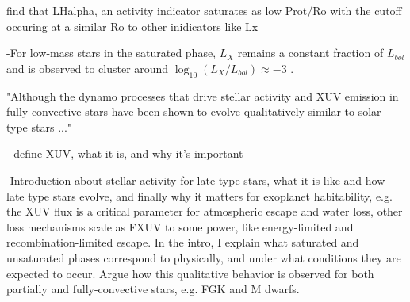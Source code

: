 \documentclass[twocolumn]{aastex62}
\begin{document}

\citet{Newton2017} find that LHalpha, an activity indicator saturates as low Prot/Ro with the cutoff occuring at a similar Ro to other inidicators like Lx

-For low-mass stars in the saturated phase, $L_{X}$ remains a constant fraction of $L_{bol}$ and is observed to cluster around $\log_{10}(L_X/L_{bol}) \approx -3$ \citep{Pizzolato2003,Wright2011,Wright2018}. 

"Although the dynamo processes that drive stellar activity and XUV emission in fully-convective stars have been shown to evolve qualitatively similar to solar-type stars \citep{Wright2016,Wright2018} ..."

- define XUV, what it is, and why it's important

-Introduction about stellar activity for late type stars, what it is like and how late type stars evolve, and finally why it matters for exoplanet habitability, e.g. the XUV flux is a critical parameter for atmospheric escape and water loss, other loss mechanisms scale as FXUV to some power, like energy-limited and recombination-limited escape. In the intro, I explain what saturated and unsaturated phases correspond to physically, and under what conditions they are expected to occur. Argue how this qualitative behavior is observed for both partially and fully-convective stars, e.g. FGK and M dwarfs.
\end{document}
